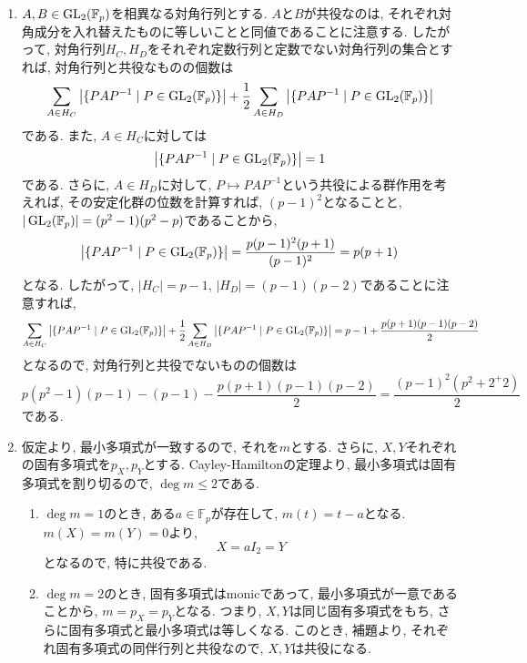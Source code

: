 \documentclass[dvipdfmx]{jsarticle}
\begin{document}
    \begin{enumerate}
        \item $A, B \in \operatorname{GL}_2(\mathbb{F}_p)$を相異なる対角行列とする.
        $A$と$B$が共役なのは, それぞれ対角成分を入れ替えたものに等しいことと同値であることに注意する.
        したがって, 対角行列$H_C, H_D$をそれぞれ定数行列と定数でない対角行列の集合とすれば,
        対角行列と共役なものの個数は
        \[
            \sum_{A \in H_C} \abs{\{PAP^{-1} \mid P \in \operatorname{GL}_2(\mathbb{F}_p)\}} + \frac{1}{2} \sum_{A \in H_D}\abs{\{PAP^{-1} \mid P \in \operatorname{GL}_2(\mathbb{F}_p)\}}
        \]
        である.
        また, $A \in H_C$に対しては
        \[
            \abs{\{PAP^{-1} \mid P \in \operatorname{GL}_2(\mathbb{F}_p)\}} = 1
        \]
        である.
        さらに, $A \in H_D$に対して, $P \mapsto PAP^{-1}$という共役による群作用を考えれば,
        その安定化群の位数を計算すれば, $(p-1)^2$となることと, $|\operatorname{GL}_2(\mathbb{F}_p)| = (p^2-1)(p^2-p)$であることから,
        \[
            \abs{\{PAP^{-1} \mid P \in \operatorname{GL}_2(\mathbb{F}_p)\}} = \frac{p(p-1)^2(p+1)}{(p-1)^2} = p(p+1)
        \]
        となる.
        したがって, $|H_C| = p-1$, $|H_D| = (p-1)(p-2)$であることに注意すれば,
        \[
            \sum_{A \in H_C} \abs{\{PAP^{-1} \mid P \in \operatorname{GL}_2(\mathbb{F}_p)\}} + \frac{1}{2} \sum_{A \in H_D}\abs{\{PAP^{-1} \mid P \in \operatorname{GL}_2(\mathbb{F}_p)\}}
            = p-1 + \frac{p(p+1)(p-1)(p-2)}{2}
        \]
        となるので,
        対角行列と共役でないものの個数は
        \[
            p(p^2-1)(p-1) - (p-1) - \frac{p(p+1)(p-1)(p-2)}{2} = \frac{(p-1)^2(p^2+2^+2)}{2}
        \]
        である.
        \item 仮定より, 最小多項式が一致するので, それを$m$とする.
        さらに, $X, Y$それぞれの固有多項式を$p_X, p_Y$とする.
        Cayley-Hamiltonの定理より, 最小多項式は固有多項式を割り切るので,
        $\deg{m} \leq 2$である.
        \begin{enumerate}
            \item $\deg{m} = 1$のとき, ある$a \in \mathbb{F}_p$が存在して,
            $m(t) = t-a$となる.
            $m(X) = m(Y) = 0$より,
            \[
                X = aI_2 = Y
            \]
            となるので, 特に共役である.
            \item $\deg{m} = 2$のとき, 固有多項式はmonicであって,
            最小多項式が一意であることから, $m = p_X = p_Y$となる.
            つまり, $X, Y$は同じ固有多項式をもち, さらに固有多項式と最小多項式は等しくなる.
            このとき, 補題より, それぞれ固有多項式の同伴行列と共役なので,
            $X, Y$は共役になる.
        \end{enumerate}

\end{enumerate}
\end{document}

